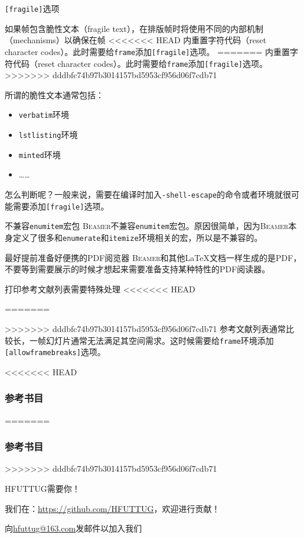 \documentclass[aspectratio=169]{beamer}
\newcommand{\Beamer}{\textsc{Beamer}}
\newcommand{\enableindent}{\setlength{\parskip}{6pt}\setlength{\parindent}{2em}}
\begin{document}
\begin{frame}{\texttt{[fragile]}选项}
	\enableindent

	如果帧包含脆性文本（fragile text），在排版帧时将使用不同的内部机制（mechanisms）以确保在帧
<<<<<<< HEAD
	内重置字符代码（reset character codes）。此时需要给\texttt{frame}添加\texttt{[fragile]}选项。
=======
内重置字符代码（reset character codes）。此时需要给\texttt{frame}添加\texttt{[fragile]}选项。
>>>>>>> dddbfc74b97b3014157bd5953cf956d06f7cdb71

	所谓的脆性文本通常包括：
	\begin{itemize}
		\item \texttt{verbatim}环境
		\item \texttt{lstlisting}环境
		\item \texttt{minted}环境
		\item ……
	\end{itemize}

	怎么判断呢？一般来说，需要在编译时加入\texttt{-shell-escape}的命令或者环境就很可能需要添加\texttt{[fragile]}选项。
\end{frame}

\begin{frame}{不兼容\texttt{enumitem}宏包}
	\enableindent
	\Beamer 不兼容\texttt{enumitem}宏包。原因很简单，因为\Beamer 本身定义了很多和\texttt{enumerate}和\texttt{itemize}环境相关的宏，所以是不兼容的。
\end{frame}

\begin{frame}{最好提前准备好便携的PDF阅览器}
	\enableindent
	\Beamer 和其他\LaTeX 文档一样生成的是PDF，不要等到需要展示的时候才想起来需要准备支持某种特性的PDF阅读器。
\end{frame}

\begin{frame}{打印参考文献列表需要特殊处理}
<<<<<<< HEAD

=======
	
>>>>>>> dddbfc74b97b3014157bd5953cf956d06f7cdb71
	参考文献列表通常比较长，一帧幻灯片通常无法满足其空间需求。这时候需要给\texttt{frame}环境添加\texttt{[allowframebreaks]}选项。
\end{frame}

\begin{frame}[allowframebreaks]
<<<<<<< HEAD
	\frametitle{参考书目}
	{
		\tiny
		\nocite{*}
		\printbibliography[heading=none]
	}
=======
\frametitle{参考书目}
{
	\tiny
	\nocite{*}
	\printbibliography[heading=none]
}
>>>>>>> dddbfc74b97b3014157bd5953cf956d06f7cdb71
\end{frame}

\begin{frame}{HFUTTUG需要你！}
	\centering

	我们在：\url{https://github.com/HFUTTUG}，欢迎进行贡献！

	向\href{mailto:hfuttug@163.com}{hfuttug@163.com}发邮件以加入我们
\end{frame}
\end{document}
